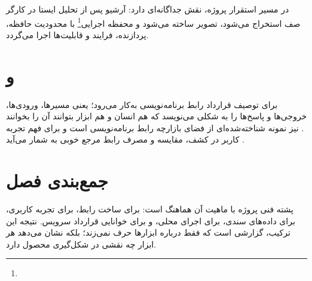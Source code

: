 در مسیر استقرار پروژه،  نقش جداگانه‌ای دارد: آرشیو پس از تحلیل ایستا در کارگر صف استخراج می‌شود، تصویر ساخته می‌شود و محفظه اجرایی\footnote{} با محدودیت حافظه، پردازنده، فرایند و قابلیت‌ها اجرا می‌گردد.

\section{ و }
 برای توصیف قرارداد رابط برنامه‌نویسی به‌کار می‌رود؛ یعنی مسیرها، ورودی‌ها، خروجی‌ها و پاسخ‌ها را به شکلی می‌نویسد که هم انسان و هم ابزار بتوانند آن را بخوانند \cite{openapi}.  نیز نمونه شناخته‌شده‌ای از فضای بازارچه رابط برنامه‌نویسی است و برای فهم تجربه کاربر در کشف، مقایسه و مصرف رابط مرجع خوبی به شمار می‌آید \cite{rapidapi}.

\section{جمع‌بندی فصل}
پشته فنی پروژه با ماهیت آن هماهنگ است:  برای ساخت رابط،  برای تجربه کاربری،  برای داده‌های سندی،  برای اجرای محلی، و  برای خوانایی قرارداد سرویس. نتیجه این ترکیب، گزارشی است که فقط درباره ابزارها حرف نمی‌زند؛ بلکه نشان می‌دهد هر ابزار چه نقشی در شکل‌گیری محصول دارد.
